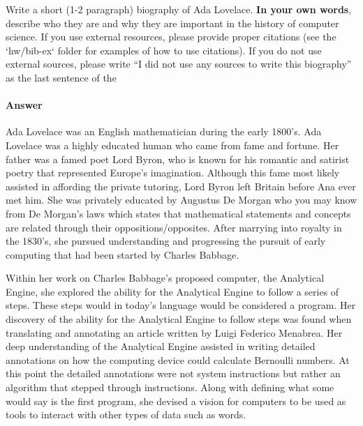 \documentclass{article}
\begin{document}

Write a short (1-2 paragraph) biography of Ada Lovelace.
\textbf{In your own words}, describe who they are and why they are important in
the history of computer science.  If you use external resources, please provide
proper citations (see the `hw/bib-ex` folder for examples of how to use
citations). If you do not use external sources, please write ``I did not
use any sources to write this biography'' as the last sentence of the
\paragraph{Answer}

Ada Lovelace was an English mathematician during the early 1800's.
Ada Lovelace was a highly educated human who came from fame and fortune.
Her father was a famed poet Lord Byron, who is known for his romantic and
satirist poetry that represented Europe's imagination. Although this fame
most likely assisted in affording the private tutoring, Lord Byron left Britain
before Ana ever met him. She was privately educated by Augustus De Morgan who
you may know from De Morgan's laws which states that mathematical statements
and concepts are related through their oppositions/opposites.
After marrying into royalty in the 1830's, she pursued understanding and
progressing the pursuit of early computing that had been started
by Charles Babbage.

Within her work on Charles Babbage's proposed computer, the Analytical Engine,
she explored the ability for the Analytical Engine to follow a series of steps.
These steps would in today's language would be considered a program.
Her discovery of the ability for the Analytical Engine to follow steps was
found when translating and annotating an article written by Luigi Federico
Menabrea. Her deep understanding of the Analytical Engine assisted in writing
detailed annotations on how the computing device could calculate Bernoulli
numbers. At this point the detailed annotations were not system instructions
but rather an algorithm that stepped through instructions.
Along with defining what some would say is the first program,
she devised a vision for computers to be used as tools to interact
with other types of data such as words.


% 
% 
\end{document}

